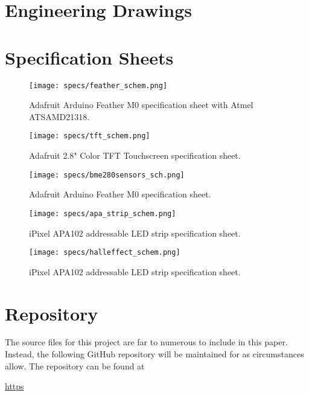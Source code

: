 \appendix
\section{Engineering Drawings}

\section{Specification Sheets}

\begin{figure}[h]
    \texttt{[image: specs/feather\_schem.png]}
    \caption{\label{feather_schem}Adafruit Arduino Feather M0 specification sheet with Atmel ATSAMD21318.}
\end{figure}

\begin{figure}[h]
    \texttt{[image: specs/tft\_schem.png]}
    \caption{\label{tftschem}Adafruit 2.8" Color TFT Touchscreen specification sheet.}
\end{figure}

\begin{figure}[h]
    \texttt{[image: specs/bme280sensors\_sch.png]}
    \caption{\label{bme280}Adafruit Arduino Feather M0 specification sheet.}
\end{figure}

\begin{figure}[h]
    \texttt{[image: specs/apa\_strip\_schem.png]}
    \caption{\label{apastrip}iPixel APA102 addressable LED strip specification sheet.}
\end{figure}

\begin{figure}[h]
\begin{center}
    \texttt{[image: specs/halleffect\_schem.png]}
    \caption{\label{halleffect}iPixel APA102 addressable LED strip specification sheet.}
\end{center}
\end{figure}

\section{Repository}

The source files for this project are far to numerous to include in this paper. Instead, the following GitHub repository will be maintained for as circumstances allow. The repository can be found at

\url{https}
